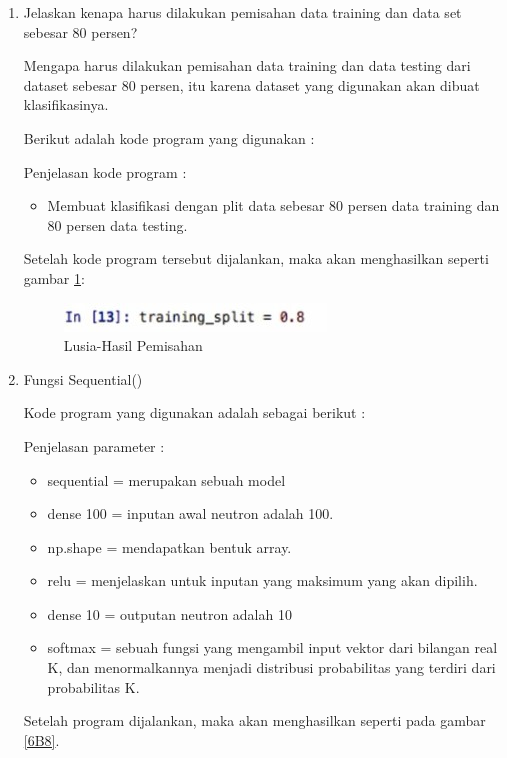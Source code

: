 \begin{enumerate}
\item Jelaskan kenapa harus dilakukan pemisahan data training dan data set sebesar 80 persen?
	\par Mengapa harus dilakukan pemisahan data training dan data testing dari dataset sebesar 80 persen, itu karena dataset yang digunakan akan dibuat klasifikasinya.
	\par Berikut adalah kode program yang digunakan :
	
	\par Penjelasan kode program :
	\begin{itemize}
	\item Membuat klasifikasi dengan plit data sebesar 80 persen data training dan 80 persen data testing.
	\end{itemize}
	
	\par Setelah kode program tersebut dijalankan, maka akan menghasilkan seperti gambar \ref{6B7}:
	
		\begin{figure}[!hbtp]
		\centering
		\includegraphics[scale=0.4]{figures/t6.jpg}
		\caption{Lusia-Hasil Pemisahan}
		\label{6B7}
		\end{figure}

\item Fungsi Sequential()
	\par Kode program yang digunakan adalah sebagai berikut :
	
	\par Penjelasan parameter :
	\begin{itemize}
	\item sequential = merupakan sebuah model
	\item dense 100 = inputan awal neutron adalah 100.
	\item np.shape = mendapatkan bentuk array.
	\item relu = menjelaskan untuk inputan yang maksimum yang akan dipilih.
	\item dense 10 = outputan neutron adalah 10
	\item softmax = sebuah fungsi yang mengambil input vektor dari bilangan real K, dan menormalkannya menjadi distribusi probabilitas yang terdiri dari probabilitas K.
	\end{itemize}
	
	\par Setelah program dijalankan, maka akan menghasilkan seperti pada gambar \ref{6B8}.
	

\end{enumerate}
